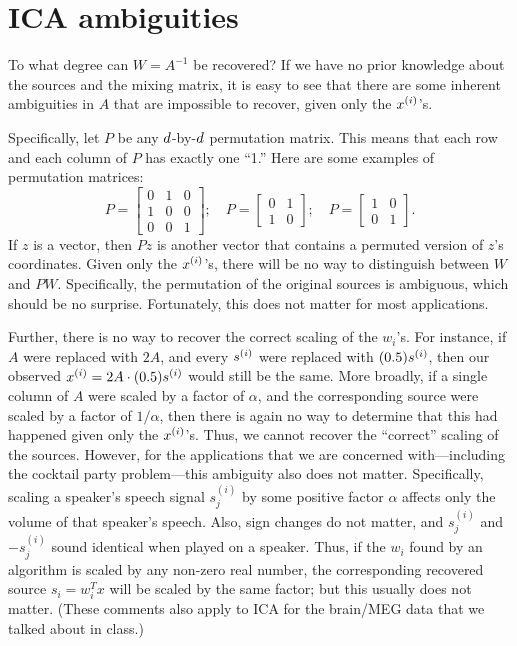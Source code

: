 \documentclass{article}
\begin{document}
\section{ICA ambiguities}

To what degree can $W = A^{-1}$ be recovered?  If we have no prior knowledge about the sources and
the mixing matrix, it is easy to see that there are some inherent ambiguities in $A$ that
are impossible to recover, given only the ${x^{(i)}}$'s.

Specifically, let $P$
be any ${d}$-by-${d}$ permutation matrix.  This means that each row and each column of $P$ has exactly one ``1.''
Here are some examples of permutation matrices:
\[
P=\left[\begin{array}{ccc} 0&1&0\\1&0&0\\0&0&1\end{array}\right]; \quad
P=\left[\begin{array}{cc} 0&1\\1&0\end{array}\right]; \quad
P=\left[\begin{array}{cc} 1&0\\0&1\end{array}\right].
\]
If $z$ is a vector, then $Pz$ is another vector that contains a permuted version of $z$'s coordinates.
Given only the ${x^{(i)}}$'s, there will be no way to distinguish between $W$ and $PW$.  Specifically,
the permutation of the original sources is ambiguous, which should be no surprise.  Fortunately, this
does not matter for most applications.

Further, there is no way to recover the correct scaling of the $w_i$'s.  For instance, if
$A$ were replaced with $2A$, and every ${s^{(i)}}$ were replaced with $(0.5) {s^{(i)}}$, then our observed
${x^{(i)}} = 2A \cdot (0.5){s^{(i)}}$ would still be the same.  More broadly, if a single column of $A$ were
scaled by a factor of $\alpha$, and the corresponding source were scaled by a factor of $1/\alpha$, then there is again no way to determine that this had happened given only the ${x^{(i)}}$'s.  Thus, we cannot
recover the ``correct'' scaling of the sources.  However, for the applications that we are concerned
with---including the cocktail party problem---this ambiguity also does not matter.  Specifically,
scaling a speaker's speech signal $s^{(i)}_j$ by some positive factor $\alpha$ affects only
the volume of that speaker's speech.  Also, sign changes do not matter, and $s^{(i)}_j$ and $-s^{(i)}_j$ sound
identical when played on a speaker.  Thus, if the $w_i$ found by an algorithm is scaled by any
non-zero real number, the corresponding recovered source $s_i = w_i^T x$ will be scaled by the
same factor; but this usually does not matter.  (These comments also apply to ICA for the brain/MEG
data that we talked about in class.)
\end{document}
